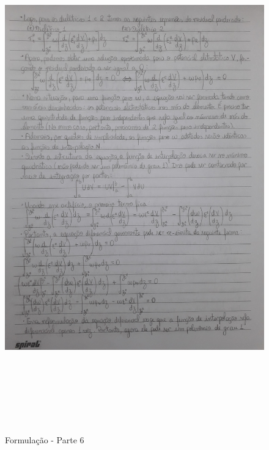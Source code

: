 \documentclass[10pt]{article}
\begin{document}
    \begin{figure}[!htb]
    \centerline{\includegraphics[width=20cm,height=22cm]{Formulação Matemática/Formulacao - Parte 6.jpg}}
    \caption{Formulação - Parte 6}
    \label{fig:fp6}
    \end{figure}
    
\end{document}
